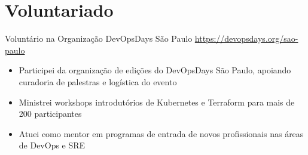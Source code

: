 \documentclass[a4paper, serif, 10pt]{moderncv}
\begin{document}
\section{Voluntariado}

        {Voluntário na Organização}
        {DevOpsDays São Paulo}
        {\url{https://devopsdays.org/sao-paulo}}
        {}
        {\begin{itemize}
\item Participei da organização de edições do DevOpsDays São Paulo, apoiando curadoria de palestras e logística do evento
\item Ministrei workshops introdutórios de Kubernetes e Terraform para mais de 200 participantes
\item Atuei como mentor em programas de entrada de novos profissionais nas áreas de DevOps e SRE
\end{itemize}}
    
\end{document}
